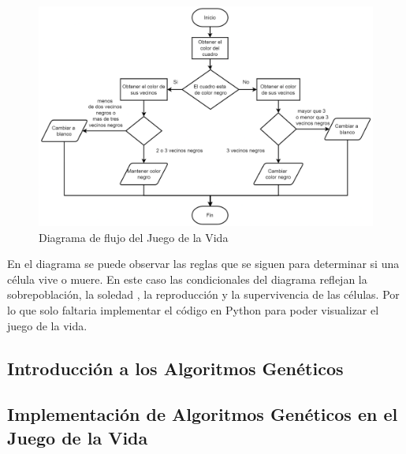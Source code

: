 \begin{figure}[H]
    \centering
    \includegraphics[width=0.9\linewidth]{IMA/DiagramaFlujoJuegoLaVida.png} 
    \caption{Diagrama de flujo del Juego de la Vida} 
\end{figure}

En el diagrama se puede observar las reglas que se siguen para determinar si una célula vive o muere.
En este caso las condicionales del diagrama reflejan la sobrepoblación, la soledad , la reproducción y la supervivencia de las células.
Por lo que solo faltaria implementar el código en Python para poder visualizar el juego de la vida.


\subsection{Introducción a los Algoritmos Genéticos}




\subsection{Implementación de Algoritmos Genéticos en el Juego de la Vida}


